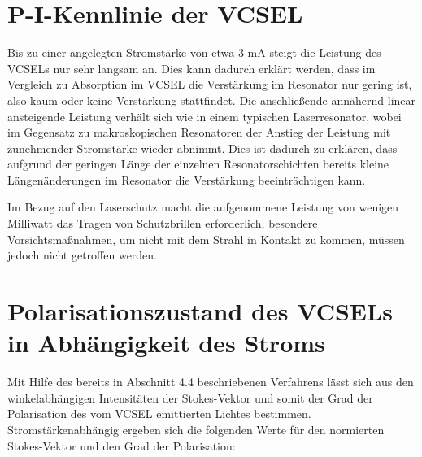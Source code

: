 \documentclass[bigchapter,colorback,accentcolor=tud4b,linedtoc,11pt]{tudreport}
\begin{document}
\section{P-I-Kennlinie der VCSEL}
Bis zu einer angelegten Stromstärke von etwa 3 mA steigt die Leistung des VCSELs nur sehr langsam an. Dies kann dadurch erklärt werden, dass im Vergleich zu Absorption im VCSEL die Verstärkung im Resonator nur gering ist, also kaum oder keine Verstärkung stattfindet. Die anschließende annähernd linear ansteigende Leistung verhält sich wie in einem typischen Laserresonator, wobei im Gegensatz zu makroskopischen Resonatoren der Anstieg der Leistung mit zunehmender Stromstärke wieder abnimmt. Dies ist dadurch zu erklären, dass aufgrund der geringen Länge der einzelnen Resonatorschichten bereits kleine Längenänderungen im Resonator die Verstärkung beeinträchtigen kann.

\begin{center}
\begin{figure}[h]
\end{figure}
\end{center}

Im Bezug auf den Laserschutz macht die aufgenommene Leistung von wenigen Milliwatt das Tragen von Schutzbrillen erforderlich, besondere Vorsichtsmaßnahmen, um nicht mit dem Strahl in Kontakt zu kommen, müssen jedoch nicht getroffen werden.

\section{Polarisationszustand des VCSELs in Abhängigkeit des Stroms}
Mit Hilfe des bereits in Abschnitt 4.4 beschriebenen Verfahrens lässt sich aus den winkelabhängigen Intensitäten der Stokes-Vektor und somit der Grad der Polarisation des vom VCSEL emittierten Lichtes bestimmen. Stromstärkenabhängig ergeben sich die folgenden Werte für den normierten Stokes-Vektor und den Grad der Polarisation:
\end{document}
